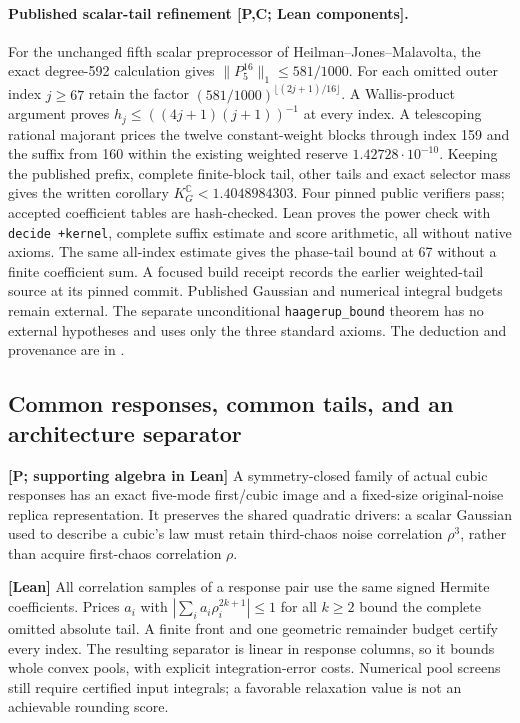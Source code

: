 \documentclass[11pt,a4paper]{article}
\newcommand{\C}{\mathbb{C}}
\newcommand{\KG}{K_G^{\C}}
\newcommand{\lean}[1]{\texttt{\small #1}}
\begin{document}
\paragraph{Published scalar-tail refinement [P,C; Lean components].}
For the unchanged fifth scalar preprocessor of Heilman--Jones--Malavolta,
the exact degree-592 calculation gives $\|P_5^{16}\|_1\le581/1000$.
For each omitted outer index $j\ge67$ retain the factor
$(581/1000)^{\lfloor(2j+1)/16\rfloor}$. A Wallis-product argument proves
$h_j\le((4j+1)(j+1))^{-1}$ at every index. A telescoping rational majorant
prices the twelve constant-weight blocks through index 159 and the suffix
from 160 within the existing weighted reserve $1.42728\cdot10^{-10}$.
Keeping the published prefix, complete finite-block
tail, other tails and exact selector mass gives the written corollary
$\KG<1.4048984303$. Four pinned public verifiers pass; accepted coefficient
tables are hash-checked. Lean proves the power check with \lean{decide +kernel},
complete suffix estimate and score arithmetic, all without native axioms.
The same all-index estimate gives the phase-tail bound at 67 without a finite
coefficient sum. A focused build receipt records the earlier weighted-tail source
at its pinned commit. Published Gaussian and
numerical integral budgets remain external. The separate unconditional \lean{haagerup\_bound}
theorem has no external hypotheses and uses only the three standard axioms.
The deduction and provenance are in
.

\subsection{Common responses, common tails, and an architecture separator}
\textbf{[P; supporting algebra in Lean]} A symmetry-closed family of actual cubic responses has an exact
five-mode first/cubic image and a fixed-size original-noise replica representation. It preserves the shared
quadratic drivers: a scalar Gaussian used to describe a cubic's law must retain third-chaos noise correlation
$\rho^3$, rather than acquire first-chaos correlation $\rho$.

\textbf{[Lean]} All correlation samples of a response pair use the same signed Hermite coefficients. Prices
$a_i$ with $|\sum_i a_i\rho_i^{2k+1}|\le1$ for all $k\ge2$ bound the complete omitted absolute tail. A finite
front and one geometric remainder budget certify every index. The resulting separator is linear in response
columns, so it bounds whole convex pools, with explicit integration-error costs. Numerical pool screens
still require certified input integrals; a favorable relaxation value is not an achievable rounding score.
\end{document}
